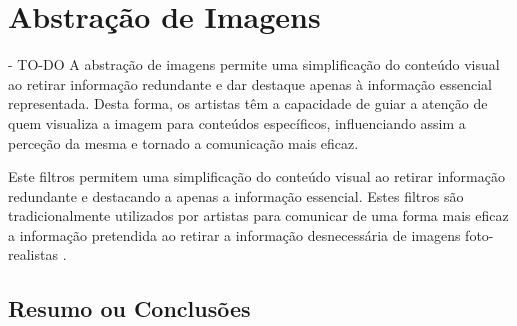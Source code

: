 \chapter{Abstração de Imagens} \label{chap:abstracao} - TO-DO
A abstração de imagens permite uma simplificação do conteúdo visual ao retirar informação redundante e dar destaque apenas à informação essencial representada. Desta forma, os artistas têm a capacidade  de guiar a atenção de quem visualiza a imagem para conteúdos específicos, influenciando assim a perceção da mesma e tornado a comunicação mais eficaz.

Este filtros permitem uma simplificação do conteúdo visual ao retirar informação redundante e destacando a apenas a informação essencial. Estes filtros são tradicionalmente utilizados por artistas para comunicar de uma forma mais eficaz a informação pretendida ao retirar a informação desnecessária de imagens foto-realistas \citep{Kyprianidis2009}.


\section{Resumo ou Conclusões}

